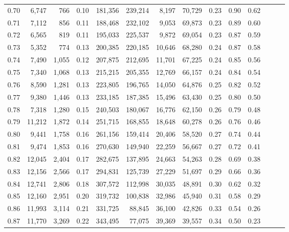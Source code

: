 \begin{tabular}{rrrrrrrrrrrrrr}
0.70 &   6,747 &    766 &  0.10 &  181,356 &  239,214 &   8,197 &  70,729 &  0.23 &  0.90 &      0.62 \\
0.71 &   7,112 &    856 &  0.11 &  188,468 &  232,102 &   9,053 &  69,873 &  0.23 &  0.89 &      0.60 \\
0.72 &   6,565 &    819 &  0.11 &  195,033 &  225,537 &   9,872 &  69,054 &  0.23 &  0.87 &      0.59 \\
0.73 &   5,352 &    774 &  0.13 &  200,385 &  220,185 &  10,646 &  68,280 &  0.24 &  0.87 &      0.58 \\
0.74 &   7,490 &  1,055 &  0.12 &  207,875 &  212,695 &  11,701 &  67,225 &  0.24 &  0.85 &      0.56 \\
0.75 &   7,340 &  1,068 &  0.13 &  215,215 &  205,355 &  12,769 &  66,157 &  0.24 &  0.84 &      0.54 \\
0.76 &   8,590 &  1,281 &  0.13 &  223,805 &  196,765 &  14,050 &  64,876 &  0.25 &  0.82 &      0.52 \\
0.77 &   9,380 &  1,446 &  0.13 &  233,185 &  187,385 &  15,496 &  63,430 &  0.25 &  0.80 &      0.50 \\
0.78 &   7,318 &  1,280 &  0.15 &  240,503 &  180,067 &  16,776 &  62,150 &  0.26 &  0.79 &      0.48 \\
0.79 &  11,212 &  1,872 &  0.14 &  251,715 &  168,855 &  18,648 &  60,278 &  0.26 &  0.76 &      0.46 \\
0.80 &   9,441 &  1,758 &  0.16 &  261,156 &  159,414 &  20,406 &  58,520 &  0.27 &  0.74 &      0.44 \\
0.81 &   9,474 &  1,853 &  0.16 &  270,630 &  149,940 &  22,259 &  56,667 &  0.27 &  0.72 &      0.41 \\
0.82 &  12,045 &  2,404 &  0.17 &  282,675 &  137,895 &  24,663 &  54,263 &  0.28 &  0.69 &      0.38 \\
0.83 &  12,156 &  2,566 &  0.17 &  294,831 &  125,739 &  27,229 &  51,697 &  0.29 &  0.66 &      0.36 \\
0.84 &  12,741 &  2,806 &  0.18 &  307,572 &  112,998 &  30,035 &  48,891 &  0.30 &  0.62 &      0.32 \\
0.85 &  12,160 &  2,951 &  0.20 &  319,732 &  100,838 &  32,986 &  45,940 &  0.31 &  0.58 &      0.29 \\
0.86 &  11,993 &  3,114 &  0.21 &  331,725 &   88,845 &  36,100 &  42,826 &  0.33 &  0.54 &      0.26 \\
0.87 &  11,770 &  3,269 &  0.22 &  343,495 &   77,075 &  39,369 &  39,557 &  0.34 &  0.50 &      0.23 \\

\end{tabular}
